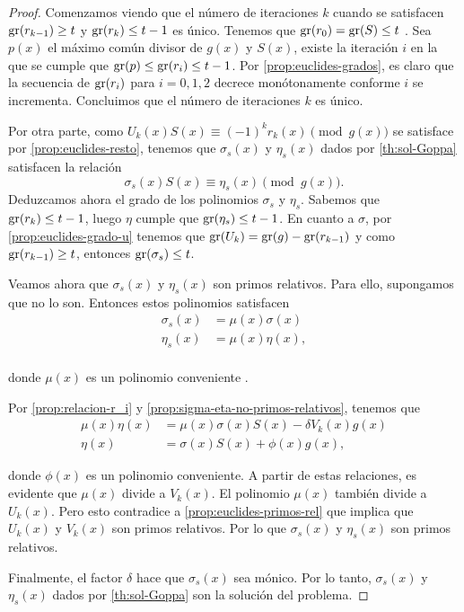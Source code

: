 \begin{proof}
    Comenzamos viendo que el número de iteraciones $k$ cuando se satisfacen $\operatorname{gr}(r_{k-1}) \geq t$ y $\operatorname{gr}(r_k) \leq t - 1$ es único. Tenemos que $\operatorname{gr}(r_0) = \operatorname{gr}(S) \leq t$ \cite[Lema 1]{Sugiyama_1975}. Sea $p(x)$ el máximo común divisor de $g(x)$ y $S(x)$, existe la iteración $i$ en la que se cumple que $\operatorname{gr}(p) \leq \operatorname{gr}(r_i) \leq t - 1$. Por \eqref{prop:euclides-grados}, es claro que la secuencia de $\operatorname{gr}(r_i)$ para $i = 0, 1, 2$ decrece monótonamente conforme $i$ se incrementa. Concluimos que el número de iteraciones $k$ es único.

    Por otra parte, como $U_k(x) S(x) \equiv (-1)^k r_k(x) \pmod{g(x)}$ se satisface por \eqref{prop:euclides-resto}, tenemos que $\sigma_s(x)$ y $\eta_s(x)$ dados por \eqref{th:sol-Goppa} satisfacen la relación
    \[
        \sigma_s(x) S(x) \equiv \eta_s(x) \pmod{g(x)}.
    \]
    Deduzcamos ahora el grado de los polinomios $\sigma_s$ y $\eta_s$. Sabemos que $\operatorname{gr}(r_k) \leq t - 1$, luego $\eta$ cumple que $\operatorname{gr}(\eta_s) \leq t - 1$. En cuanto a $\sigma$, por \eqref{prop:euclides-grado-u} tenemos que $\operatorname{gr}(U_k) = \operatorname{gr}(g) - \operatorname{gr}(r_{k-1})$ y como $\operatorname{gr}(r_{k-1}) \geq t$, entonces $\operatorname{gr}(\sigma_s) \leq t$.

    Veamos ahora que $\sigma_s(x)$ y $\eta_s(x)$ son primos relativos. Para ello, supongamos que no lo son. Entonces estos polinomios satisfacen
    \begin{equation}\label{prop:sigma-eta-no-primos-relativos}
        \begin{split}
            \sigma_s(x)     &=   \mu(x) \sigma(x)\\
            \eta_s(x)       &= \mu(x) \eta(x),\\
        \end{split}
    \end{equation}

    donde $\mu(x)$ es un polinomio conveniente \cite[Página 92]{Sugiyama_1975}.
    
    Por \eqref{prop:relacion-r_i} y \eqref{prop:sigma-eta-no-primos-relativos}, tenemos que
    \begin{align*}
        \mu(x) \eta(x)  &=   \mu(x) \sigma(x) S(x) - \delta V_k(x) g(x)\\
        \eta(x)         &=  \sigma(x) S(x) + \phi(x) g(x),
    \end{align*}
    
    donde $\phi(x)$ es un polinomio conveniente. A partir de estas relaciones, es evidente que $\mu(x)$ divide a $V_k(x)$. El polinomio $\mu(x)$ también divide a $U_k(x)$. Pero esto contradice a \eqref{prop:euclides-primos-rel} que implica que $U_k(x)$ y $V_k(x)$ son primos relativos. Por lo que $\sigma_s(x)$ y $\eta_s(x)$ son primos relativos.

    Finalmente, el factor $\delta$ hace que $\sigma_s(x)$ sea mónico. Por lo tanto, $\sigma_s(x)$ y $\eta_s(x)$ dados por \eqref{th:sol-Goppa} son la solución del problema.
\end{proof}

